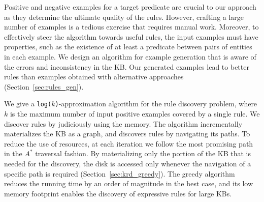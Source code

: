 Positive and negative examples for a target predicate are crucial to our approach as they determine the ultimate quality of the rules. However, crafting a large number of examples is a tedious exercise that requires manual work. Moreover, to effectively steer the algorithm towards useful rules, the input examples must have properties, such as the existence of at least a predicate between pairs of entities in each example. We design an algorithm for example generation that is aware of the errors and inconsistency in the KB. Our generated examples lead to better rules than examples obtained with alternative approaches (Section~\ref{sec:rules_gen}). %


We give a \texttt{log($k$)}-approximation algorithm for the rule discovery problem, %
where $k$ is the maximum number of input positive examples covered by a single rule. We discover rules by judiciously using the memory. The algorithm incrementally 
materializes the KB as a graph, and discovers rules by navigating its paths. To reduce the use of resources, at each iteration we follow the most promising path in the $A^*$ traversal fashion. %
By materializing only the portion of the KB that is needed for the discovery, 
the disk is accessed only whenever the navigation of a specific path is required (Section~\ref{sec:krd_greedy}). 
The greedy algorithm reduces the running time by an order of magnitude in the best case, and its low memory footprint enables the discovery of expressive rules for large KBs. %



